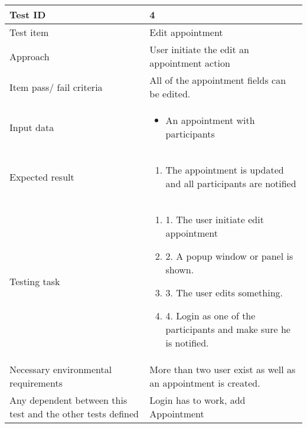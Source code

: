 \documentclass[a4paper, 10pt]{article}
\begin{document}
\begin{tabularx}{\textwidth}{ |X|X| }
\hline
\rowcolor{Gray}
Test ID & 4 \\ \hline
Test item & Edit appointment \\ \hline
Approach & User initiate the edit an appointment action \\ \hline
Item pass/ fail criteria & All of the appointment fields can be edited.\\ \hline
Input data &
\begin{itemize}
\item An appointment with participants
\end{itemize}\\ \hline
Expected result &
\begin{enumerate}
\item The appointment is updated and all participants are notified
\end{enumerate} \\ \hline
Testing task &
\begin{enumerate}
\item 1. The user initiate edit appointment
\item 2. A popup window or panel is shown.
\item 3. The user edits something.
\item 4. Login as one of the participants and make sure he is notified.
\end{enumerate}	\\ \hline
Necessary environmental requirements & More than two user exist as well as an appointment is created. \\ \hline
Any dependent between this test and the other tests defined & Login has to work, add Appointment \\ \hline

\end{tabularx}
\end{document}
